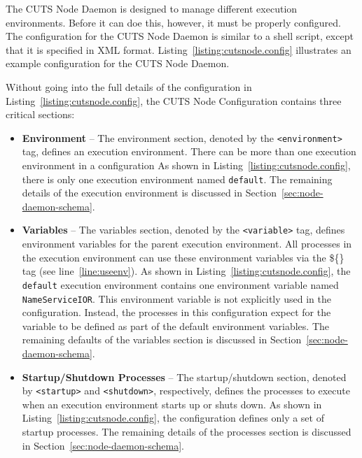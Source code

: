The CUTS Node Daemon is designed to manage different execution 
environments. Before it can doe this, however, it must be properly
configured. The configuration for the CUTS Node Daemon is similar
to a shell script, except that it is specified in XML format. 
Listing~\ref{listing:cutsnode.config} illustrates an example
configuration for the CUTS Node Daemon.


Without going into the full details of the configuration in
Listing~\ref{listing:cutsnode.config}, the CUTS Node Configuration
contains three critical sections:
\begin{itemize}
  \item \textbf{Environment} -- The environment section, denoted 
  by the \texttt{<environment>} tag, defines an execution environment. 
  There can be more than one execution environment in a configuration
  As shown in Listing~\ref{listing:cutsnode.config}, there is only
  one execution environment named \texttt{default}. The remaining 
  details of the execution environment is discussed in 
  Section~\ref{sec:node-daemon-schema}.
  
  \item \textbf{Variables} -- The variables section, denoted
  by the \texttt{<variable>} tag, defines environment variables for the 
  parent execution environment. All processes in the execution environment 
  can use these environment variables via the \$\{\} tag (see 
  line~\ref{line:useenv}). As shown
  in Listing~\ref{listing:cutsnode.config}, the \texttt{default}
  execution environment contains one environment variable named
  \texttt{NameServiceIOR}. This environment variable is not 
  explicitly used in the configuration. Instead, the processes
  in this configuration expect for the variable to be defined
  as part of the default environment variables. The 
  remaining defaults of the variables section is discussed
  in Section~\ref{sec:node-daemon-schema}.

  \item \textbf{Startup/Shutdown Processes} -- The startup/shutdown section, 
  denoted by \texttt{<startup>} and \texttt{<shutdown>}, 
  respectively, defines the processes to execute when an execution
  environment starts up or shuts down. As shown in
  Listing~\ref{listing:cutsnode.config}, the configuration defines
  only a set of startup processes. The remaining details of the 
  processes section is discussed in Section~\ref{sec:node-daemon-schema}.
\end{itemize}

